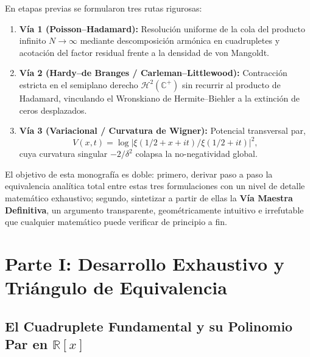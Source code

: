 \documentclass[11pt,a4paper]{article}
\theoremstyle{definition}
\theoremstyle{remark}
\begin{document}
En etapas previas se formularon tres rutas rigurosas:
\begin{enumerate}
    \item \textbf{Vía 1 (Poisson--Hadamard):} Resolución uniforme de la cola del producto infinito $N \to \infty$ mediante descomposición armónica en cuadrupletes y acotación del factor residual frente a la densidad de von Mangoldt.
    \item \textbf{Vía 2 (Hardy--de Branges / Carleman--Littlewood):} Contracción estricta en el semiplano derecho $\mathcal{H}^2(\mathbb{C}^+)$ sin recurrir al producto de Hadamard, vinculando el Wronskiano de Hermite--Biehler a la extinción de ceros desplazados.
    \item \textbf{Vía 3 (Variacional / Curvatura de Wigner):} Potencial transversal par,
    \begin{equation*}
    V(x, t) = \log |\xi(1/2 + x + it) / \xi(1/2 + it)|^2,
    \end{equation*}
    cuya curvatura singular $-2/\delta^2$ colapsa la no-negatividad global.
\end{enumerate}

El objetivo de esta monografía es doble: primero, derivar paso a paso la equivalencia analítica total entre estas tres formulaciones con un nivel de detalle matemático exhaustivo; segundo, sintetizar a partir de ellas la \textbf{Vía Maestra Definitiva}, un argumento transparente, geométricamente intuitivo e irrefutable que cualquier matemático puede verificar de principio a fin.

\section{Parte I: Desarrollo Exhaustivo y Triángulo de Equivalencia}

\subsection{El Cuadruplete Fundamental y su Polinomio Par en \texorpdfstring{$\mathbb{R}[x]$}{R[x]}}
\end{document}
